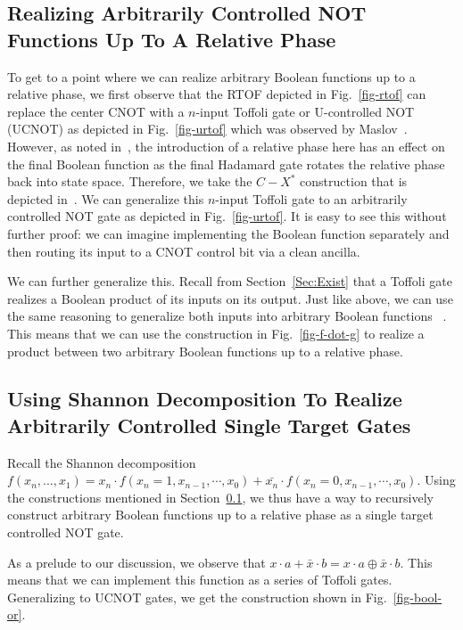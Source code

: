 \subsection{Realizing Arbitrarily Controlled NOT Functions Up To A Relative Phase}
\label{Subsec:UNOT}
To get to a point where we can realize arbitrary Boolean functions up to a relative phase, we first observe that the RTOF depicted in Fig.~\ref{fig-rtof} can replace the center CNOT with a $n$-input Toffoli gate or U-controlled NOT (UCNOT) as depicted in Fig.~\ref{fig-urtof} which was observed by Maslov~\cite{bib-rtof-maslov}. However, as noted in~\cite{bib-amy-phase-state}, the introduction of a relative phase here has an effect on the final Boolean function as the final Hadamard gate rotates the relative phase back into state space. Therefore, we take the $C-X^*$ construction that is depicted in~\cite{bib-amy-phase-state}. We can generalize this $n$-input Toffoli gate to an arbitrarily controlled NOT gate as depicted in Fig.~\ref{fig-urtof}. It is easy to see this without further proof: we can imagine implementing the Boolean function separately and then routing its input to a CNOT control bit via a clean ancilla.

We can further generalize this. Recall from Section~\ref{Sec:Exist} that a Toffoli gate realizes a Boolean product of its inputs on its output. Just like above, we can use the same reasoning to generalize both inputs into arbitrary Boolean functions~\cite{bib-amy-phase-state} . This means that we can use the construction in Fig.~\ref{fig-f-dot-g} to realize a product between two arbitrary Boolean functions up to a relative phase. 


\subsection{Using Shannon Decomposition To Realize Arbitrarily Controlled Single Target Gates}

Recall the Shannon decomposition $f(x_n,...,x_1) = x_n \cdot f(x_n=1,x_{n-1},\cdots,x_0) + \bar{x_n} \cdot f(x_n=0,x_{n-1},\cdots,x_0)$. Using the constructions mentioned in Section~\ref{Subsec:UNOT}, we thus have a way to recursively construct arbitrary Boolean functions up to a relative phase as a single target controlled NOT gate.

As a prelude to our discussion, we observe that $x \cdot a  + \bar{x} \cdot b = x \cdot a \oplus \bar{x} \cdot b$. This means that we can implement this function as a series of Toffoli gates. Generalizing to UCNOT gates, we get the construction shown in Fig.~\ref{fig-bool-or}.

